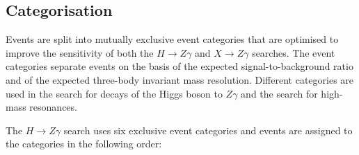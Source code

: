\subsection{Categorisation}
\label{sec:categorisation}

Events are split into mutually exclusive event categories that are optimised to improve the sensitivity of 
both the $H\to Z\gamma$ and $X\to Z\gamma$ searches.
The event categories separate events on the basis of the expected signal-to-background
ratio and of the expected three-body invariant mass resolution. Different categories
are used in the search for decays of the Higgs boson to $Z\gamma$ 
and the search for high-mass resonances. 


The $H\to Z\gamma$ search uses six exclusive event categories and events are assigned to the categories in
the following order:

